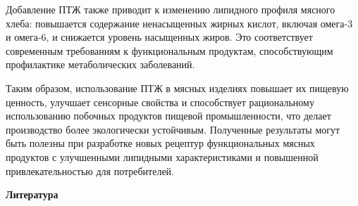 \begin{multicols}{2}
Добавление ПТЖ также приводит к изменению липидного профиля мясного
хлеба: повышается содержание ненасыщенных жирных кислот, включая омега-3
и омега-6, и снижается уровень насыщенных жиров. Это соответствует
современным требованиям к функциональным продуктам, способствующим
профилактике метаболических заболеваний.

Таким образом, использование ПТЖ в мясных изделиях повышает их пищевую
ценность, улучшает сенсорные свойства и способствует рациональному
использованию побочных продуктов пищевой промышленности, что делает
производство более экологически устойчивым. Полученные результаты могут
быть полезны при разработке новых рецептур функциональных мясных
продуктов с улучшенными липидными характеристиками и повышенной
привлекательностью для потребителей.
\end{multicols}

\begin{center}
{\bfseries Литература}
\end{center}

